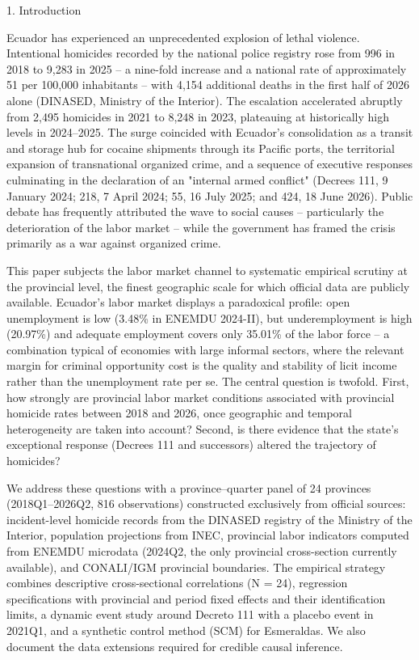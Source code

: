1. Introduction




Ecuador has experienced an unprecedented explosion of lethal violence. Intentional homicides recorded by the national police registry rose from 996 in 2018 to 9,283 in 2025 -- a nine-fold increase and a national rate of approximately 51 per 100,000 inhabitants -- with 4,154 additional deaths in the first half of 2026 alone (DINASED, Ministry of the Interior). The escalation accelerated abruptly from 2,495 homicides in 2021 to 8,248 in 2023, plateauing at historically high levels in 2024--2025. The surge coincided with Ecuador's consolidation as a transit and storage hub for cocaine shipments through its Pacific ports, the territorial expansion of transnational organized crime, and a sequence of executive responses culminating in the declaration of an "internal armed conflict" (Decrees 111, 9 January 2024; 218, 7 April 2024; 55, 16 July 2025; and 424, 18 June 2026). Public debate has frequently attributed the wave to social causes -- particularly the deterioration of the labor market -- while the government has framed the crisis primarily as a war against organized crime.


This paper subjects the labor market channel to systematic empirical scrutiny at the provincial level, the finest geographic scale for which official data are publicly available. Ecuador's labor market displays a paradoxical profile: open unemployment is low (3.48\% in ENEMDU 2024-II), but underemployment is high (20.97\%) and adequate employment covers only 35.01\% of the labor force -- a combination typical of economies with large informal sectors, where the relevant margin for criminal opportunity cost is the quality and stability of licit income rather than the unemployment rate per se. The central question is twofold. First, how strongly are provincial labor market conditions associated with provincial homicide rates between 2018 and 2026, once geographic and temporal heterogeneity are taken into account? Second, is there evidence that the state's exceptional response (Decrees 111 and successors) altered the trajectory of homicides?


We address these questions with a province--quarter panel of 24 provinces (2018Q1--2026Q2, 816 observations) constructed exclusively from official sources: incident-level homicide records from the DINASED registry of the Ministry of the Interior, population projections from INEC, provincial labor indicators computed from ENEMDU microdata (2024Q2, the only provincial cross-section currently available), and CONALI/IGM provincial boundaries. The empirical strategy combines descriptive cross-sectional correlations (N = 24), regression specifications with provincial and period fixed effects and their identification limits, a dynamic event study around Decreto 111 with a placebo event in 2021Q1, and a synthetic control method (SCM) for Esmeraldas. We also document the data extensions required for credible causal inference.


